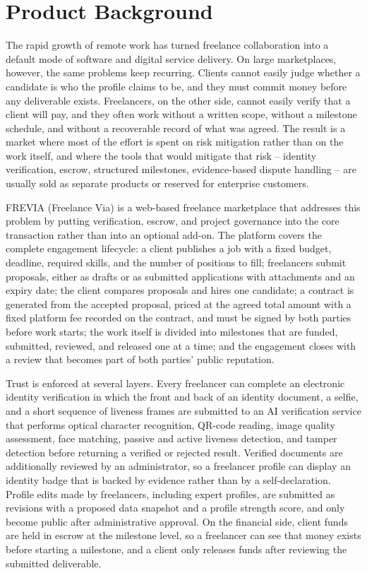 \section{Product Background}

The rapid growth of remote work has turned freelance collaboration into a default mode of software and digital service delivery. On large marketplaces, however, the same problems keep recurring. Clients cannot easily judge whether a candidate is who the profile claims to be, and they must commit money before any deliverable exists. Freelancers, on the other side, cannot easily verify that a client will pay, and they often work without a written scope, without a milestone schedule, and without a recoverable record of what was agreed. The result is a market where most of the effort is spent on risk mitigation rather than on the work itself, and where the tools that would mitigate that risk -- identity verification, escrow, structured milestones, evidence-based dispute handling -- are usually sold as separate products or reserved for enterprise customers.

FREVIA (Freelance Via) is a web-based freelance marketplace that addresses this problem by putting verification, escrow, and project governance into the core transaction rather than into an optional add-on. The platform covers the complete engagement lifecycle: a client publishes a job with a fixed budget, deadline, required skills, and the number of positions to fill; freelancers submit proposals, either as drafts or as submitted applications with attachments and an expiry date; the client compares proposals and hires one candidate; a contract is generated from the accepted proposal, priced at the agreed total amount with a fixed platform fee recorded on the contract, and must be signed by both parties before work starts; the work itself is divided into milestones that are funded, submitted, reviewed, and released one at a time; and the engagement closes with a review that becomes part of both parties' public reputation.

Trust is enforced at several layers. Every freelancer can complete an electronic identity verification in which the front and back of an identity document, a selfie, and a short sequence of liveness frames are submitted to an AI verification service that performs optical character recognition, QR-code reading, image quality assessment, face matching, passive and active liveness detection, and tamper detection before returning a verified or rejected result. Verified documents are additionally reviewed by an administrator, so a freelancer profile can display an identity badge that is backed by evidence rather than by a self-declaration. Profile edits made by freelancers, including expert profiles, are submitted as revisions with a proposed data snapshot and a profile strength score, and only become public after administrative approval. On the financial side, client funds are held in escrow at the milestone level, so a freelancer can see that money exists before starting a milestone, and a client only releases funds after reviewing the submitted deliverable.

